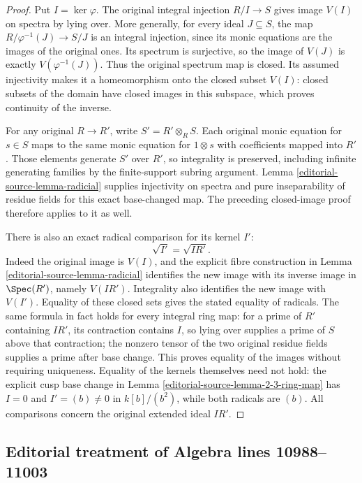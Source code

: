 \begin{proof}
Put $I=\ker\varphi$. The original integral
injection $R/I\to S$ gives image $V(I)$
on spectra by lying over. More generally,
for every ideal $J\subseteq S$, the
map $R/\varphi^{-1}(J)\to S/J$ is an
integral injection, since its monic
equations are the images of the
original ones. Its spectrum is
surjective, so the image of $V(J)$
is exactly $V(\varphi^{-1}(J))$.
Thus the original spectrum map is
closed. Its assumed injectivity
makes it a homeomorphism onto
the closed subset $V(I)$: closed
subsets of the domain have closed
images in this subspace, which
proves continuity of the inverse.

For any original $R\to R'$, write
$S'=R'\otimes_R S$. Each original
monic equation for $s\in S$ maps
to the same monic equation for
$1\otimes s$ with coefficients
mapped into $R'$. Those elements
generate $S'$ over $R'$, so
integrality is preserved, including
infinite generating families by
the finite-support subring argument.
Lemma \ref{editorial-source-lemma-radicial} supplies
injectivity on spectra and pure
inseparability of residue fields
for this exact base-changed map.
The preceding closed-image proof
therefore applies to it as well.

There is also an exact radical
comparison for its kernel $I'$:
$$
\sqrt{I'}=\sqrt{IR'}.
$$
Indeed the original image is
$V(I)$, and the explicit fibre
construction in Lemma
\ref{editorial-source-lemma-radicial} identifies the
new image with its inverse image
in $\Spec(R')$, namely $V(IR')$.
Integrality also identifies the
new image with $V(I')$. Equality
of these closed sets gives the
stated equality of radicals.
The same formula in fact holds
for every integral ring map:
for a prime of $R'$ containing
$IR'$, its contraction contains
$I$, so lying over supplies a
prime of $S$ above that contraction;
the nonzero tensor of the two
original residue fields supplies
a prime after base change. This
proves equality of the images
without requiring uniqueness.
Equality of the kernels themselves
need not hold: the explicit cusp
base change in Lemma
\ref{editorial-source-lemma-2-3-ring-map} has $I=0$
and $I'=(b)\neq0$ in $k[b]/(b^2)$,
while both radicals are $(b)$.
All comparisons concern the
original extended ideal $IR'$.
\end{proof}


\subsection{Editorial treatment of Algebra lines 10988--11003}

